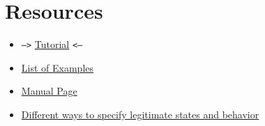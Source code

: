 
\section{Resources}
\begin{itemize}
\item  \texttt{-->} \href{tut.html}{Tutorial} \texttt{<--}
\item \href{examplelist.html}{List of Examples}
\item \href{man.html}{Manual Page}
\item \href{legit.html}{Different ways to specify legitimate states and behavior}
\end{itemize}





